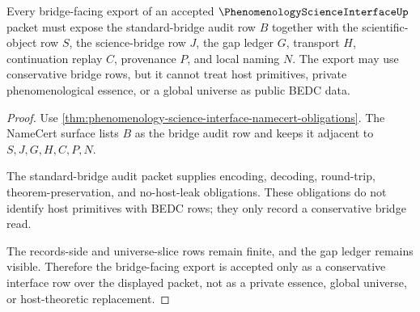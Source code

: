 \begin{theorem}
\label{thm:phenomenology-science-interface-bridge-obligations}
Every bridge-facing export of an accepted $\PhenomenologyScienceInterfaceUp$ packet must expose the standard-bridge audit row $B$ together with the scientific-object row $S$, the science-bridge row $J$, the gap ledger $G$, transport $H$, continuation replay $C$, provenance $P$, and local naming $N$. The export may use conservative bridge rows, but it cannot treat host primitives, private phenomenological essence, or a global universe as public BEDC data.
\end{theorem}
\begin{proof}
Use \autoref{thm:phenomenology-science-interface-namecert-obligations}. The NameCert surface lists $B$ as the bridge audit row and keeps it adjacent to $S,J,G,H,C,P,N$.

The standard-bridge audit packet supplies encoding, decoding, round-trip, theorem-preservation, and no-host-leak obligations. These obligations do not identify host primitives with BEDC rows; they only record a conservative bridge read.

The records-side and universe-slice rows remain finite, and the gap ledger remains visible. Therefore the bridge-facing export is accepted only as a conservative interface row over the displayed packet, not as a private essence, global universe, or host-theoretic replacement.
\end{proof}



